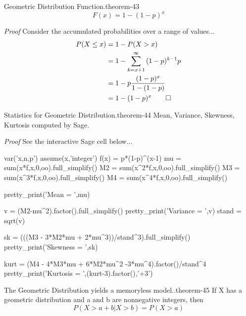 \documentclass[10pt,]{book}
\makeatletter
\renewcommand*{\proofname}{Proof}
\renewenvironment{proof}[1][\proofname]{\par
  \pushQED{\qed}%
  \normalfont \topsep6\p@\@plus6\p@\relax
  \trivlist
  \item\relax
    {\itshape
    #1\@addpunct{.}}\hspace\labelsep\ignorespaces
}{%
  \popQED\endtrivlist\@endpefalse
}
\numberwithin{equation}{section}
\newcommand{\gt}{>}
\makeatother
\begin{document}
%
\par
\hypertarget{p-945}{}%
\begin{theorem}{Geometric Distribution Function.}{}{theorem-43}%
\hypertarget{p-946}{}%
%
\begin{equation*}
F(x) =  1- (1-p)^{x}
\end{equation*}
%
\end{theorem}
\begin{proof}\hypertarget{proof-45}{}
\hypertarget{p-947}{}%
Consider the accumulated probabilities over a range of values...%
\begin{align*}
P(X \le x) & = 1 - P(X \gt x)\\
& = 1- \sum_{k={x+1}}^{\infty} {(1-p)^{k-1}p}\\
& = 1- p \frac{(1-p)^{x}}{1-(1-p)}\\
& = 1- (1-p)^{x}\qedhere
\end{align*}
%
\end{proof}
%
\par
\hypertarget{p-948}{}%
\begin{theorem}{Statistics for Geometric Distribution.}{}{theorem-44}%
\hypertarget{p-949}{}%
Mean, Variance, Skewness, Kurtosis computed by Sage.%
\end{theorem}
\begin{proof}\hypertarget{proof-46}{}
\hypertarget{p-950}{}%
See the interactive Sage cell below...%
\end{proof}
 \begin{sageinput}
var('x,n,p')
assume(x,'integer')
f(x) = p*(1-p)^(x-1)
mu = sum(x*f,x,0,oo).full_simplify()
M2 = sum(x^2*f,x,0,oo).full_simplify()
M3 = sum(x^3*f,x,0,oo).full_simplify()
M4 = sum(x^4*f,x,0,oo).full_simplify()

pretty_print('Mean = ',mu)

v = (M2-mu^2).factor().full_simplify()
pretty_print('Variance = ',v)
stand = sqrt(v)

sk = (((M3 - 3*M2*mu + 2*mu^3))/stand^3).full_simplify()
pretty_print('Skewness = ',sk)

kurt = (M4 - 4*M3*mu + 6*M2*mu^2 -3*mu^4).factor()/stand^4
pretty_print('Kurtosis = ',(kurt-3).factor(),'+3')
\end{sageinput}
%
\par
\hypertarget{p-951}{}%
\begin{theorem}{The Geometric Distribution yields a memoryless model..}{}{theorem-45}%
\hypertarget{p-952}{}%
If X has a geometric distribution and a and b are nonnegative integers, then%
\begin{equation*}
P( X > a + b | X > b ) = P( X > a)
\end{equation*}
%
\end{theorem}
\end{document}

